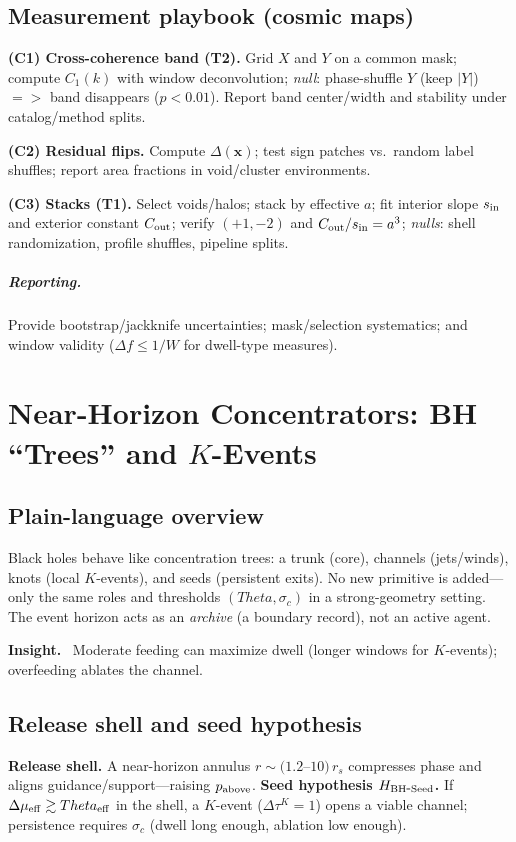 \documentclass[12pt,a4paper,oneside]{scrreprt}
\def\Theta{Theta}%
\def\Rightarrow{=>}%
\newenvironment{insight}{\par\vspace{0.5em}\noindent\textbf{Insight.}\ }{\par\vspace{0.5em}}
\begin{document}
\section{Measurement playbook (cosmic maps)}\label{sec:lss-playbook}
\textbf{(C1) Cross-coherence band (T2).} 
Grid $X$ and $Y$ on a common mask; compute $C_1(k)$ with window deconvolution; 
\emph{null}: phase-shuffle $Y$ (keep $|Y|$) $\Rightarrow$ band disappears ($p<0.01$). 
Report band center/width and stability under catalog/method splits.

\textbf{(C2) Residual flips.}
Compute $\Delta(\mathbf x)$; test sign patches vs.\ random label shuffles; report area fractions in void/cluster environments.

\textbf{(C3) Stacks (T1).}
Select voids/halos; stack by effective $a$; fit interior slope $s_{\rm in}$ and exterior constant $C_{\rm out}$; verify $(+1,-2)$ and $C_{\rm out}/s_{\rm in}=a^3$; 
\emph{nulls}: shell randomization, profile shuffles, pipeline splits.

\paragraph{Reporting.}
Provide bootstrap/jackknife uncertainties; mask/selection systematics; and window validity ($\Delta f\le 1/W$ for dwell-type measures).

\chapter{Near-Horizon Concentrators: BH ``Trees'' and $K$-Events}\label{ch:bh-tree}

\section*{Plain-language overview}
Black holes behave like concentration trees: a trunk (core), channels (jets/winds), knots (local $K$-events), and seeds (persistent exits). 
No new primitive is added—only the same roles and thresholds $(\Theta,\sigma_c)$ in a strong-geometry setting.
The event horizon acts as an \emph{archive} (a boundary record), not an active agent.

\begin{insight}
Moderate feeding can maximize dwell (longer windows for $K$-events); overfeeding ablates the channel.
\end{insight}

\section{Release shell and seed hypothesis}\label{sec:bh-release}
\textbf{Release shell.} A near-horizon annulus $r\sim(1.2$–$10)\,r_s$ compresses phase and aligns guidance/support—raising $p_{\rm above}$.
\textbf{Seed hypothesis $H_{\rm BH\mbox{-}Seed}$.} 
If $\Delta\mu_{\rm eff}\gtrsim\Theta_{\rm eff}$ in the shell, a $K$-event ($\Delta\tau^K=1$) opens a viable channel; persistence requires $\sigma_c$ (dwell long enough, ablation low enough).
\end{document}
